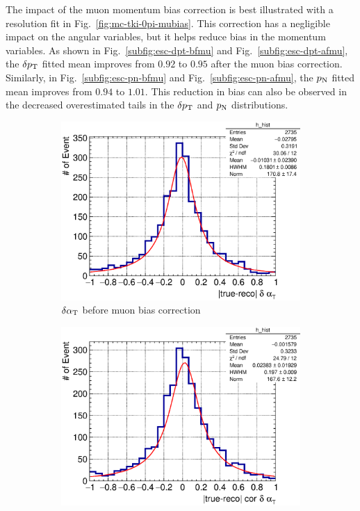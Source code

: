      The impact of the muon momentum bias correction is best illustrated with a resolution fit in Fig.~\ref{fig:mc-tki-0pi-mubias}.
     This correction has a negligible impact on the angular variables, but it helps reduce bias in the momentum variables.
     As shown in Fig.~\ref{subfig:esc-dpt-bfmu} and Fig.~\ref{subfig:esc-dpt-afmu}, the $\delta p_\textrm{T}$ fitted mean improves from $0.92$ to $0.95$ after the muon bias correction.
     Similarly, in Fig.~\ref{subfig:esc-pn-bfmu} and Fig.~\ref{subfig:esc-pn-afmu}, the $p_\textrm{N}$ fitted mean improves from $0.94$ to $1.01$.
     This reduction in bias can also be observed in the decreased overestimated tails in the $\delta p_\textrm{T}$ and $p_\textrm{N}$ distributions.
     \begin{figure}
          \begin{subfigure}[b]{\dbfigwid\textwidth}
               \centering
               \includegraphics[width=\textwidth]{figures/perf/tki/dalphat_rat_hist_al14.eps}
               \caption{$\delta\alpha_\textrm{T}$ before muon bias correction}
               \label{subfig:esc-dalpha-bfmu}
          \end{subfigure}         
          \begin{subfigure}[b]{\dbfigwid\textwidth}
               \centering
               \includegraphics[width=\textwidth]{figures/perf/tki/cor_dalphat_rat_hist_al14.eps}

\end{subfigure}
\end{figure}
